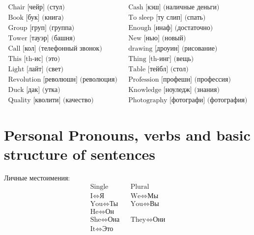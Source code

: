 \documentclass{tstextbook}
\begin{document}
	\begin{example}
		\begin{align*}
			\text{Chair [чейр] (стул)} && \text{Cash [кэш] (наличные деньги)} \\
			\text{Book [бук] (книга)} && \text{To sleep [ту слип] (спать)} \\
			\text{Group [груп] (группа)}  && \text{Enough [инаф] (достаточно)} \\
			\text{Tower [тауэр] (башня)} && \text{New [нью] (новый)} \\
			\text{Call [кол] (телефонный звонок)} && \text{drawing [дроуин] (рисование)} \\
			\text{This [th-ис] (это)} && \text{Thing [th-инг] (вещь)} \\
			\text{Light [лайт] (свет)} && \text{Table [тейбл] (стол)} \\
			\text{Revolution [революшн] (революция)} && \text{Profession [профешн] (профессия)} \\
			\text{Duck [дак] (утка)} && \text{Knowledge [ноуледж] (знания)} \\
			\text{Quality [кволити] (качество)} && \text{Photography [фотографи] (фотография)}
		\end{align*}
	\end{example}
	
	\section{Personal Pronouns, verbs and basic structure of sentences}
	
	\begin{theorem}
		\label{th: personal_pronouns}
		Личные местоимения:
		\begin{align*}
			\text{Single} && \text{Plural}  \\
			\text{I} \Leftrightarrow \text{Я} && \text{We} \Leftrightarrow \text{Мы} \\
			\text{You} \Leftrightarrow \text{Ты} && \text{You} \Leftrightarrow \text{Вы} \\
			\text{He} \Leftrightarrow \text{Он} \\
			\text{She} \Leftrightarrow \text{Она} && \text{They} \Leftrightarrow \text{Они} \\
			\text{It} \Leftrightarrow \text{Это} \\
		\end{align*}
	\end{theorem}
\end{document}
